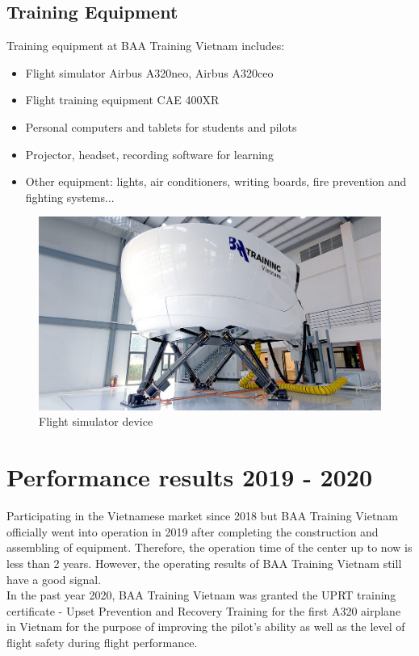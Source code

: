     \subsection{Training Equipment}
        Training equipment at BAA Training Vietnam includes:
        \begin{itemize}
            \item Flight simulator Airbus A320neo, Airbus A320ceo
            \item Flight training equipment CAE 400XR
            \item Personal computers and tablets for students and pilots
            \item Projector, headset, recording software for learning
            \item 
            Other equipment: lights, air conditioners, writing boards, fire prevention and fighting systems...
        \end{itemize}
        \begin{figure}[H]
            \centering
            \includegraphics[width=0.6\linewidth]{img/flight-simulator.jpg}
            \caption{Flight simulator device}
        \end{figure}

\section{Performance results 2019 - 2020}
    Participating in the Vietnamese market since 2018 but BAA Training Vietnam officially went into operation in 2019 after completing the construction 
    and assembling of equipment. Therefore, the operation time of the center up to now is less than 2 years. However, the operating results of BAA 
    Training Vietnam still have a good signal. \\ 
    \vspace{3mm}
    In the past year 2020, BAA Training Vietnam was granted the UPRT training certificate - Upset Prevention and Recovery Training for the first A320 
    airplane in Vietnam for the purpose of improving the pilot's ability as well as the level of flight safety during flight performance.